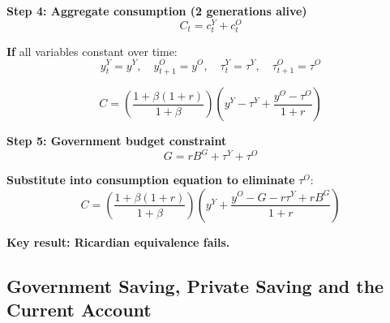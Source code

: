 \documentclass[12pt]{article}
\begin{document}
{\textbf{Step 4: Aggregate consumption (2 generations alive)}
\[
C_t = c_t^Y + c_t^O
\]

\textbf{If } all variables constant over time:
\[
y_t^Y = y^Y, \quad y_{t+1}^O = y^O, \quad \tau_t^Y = \tau^Y, \quad \tau_{t+1}^O = \tau^O
\]

\[
C = \left( \frac{1 + \beta (1 + r)}{1 + \beta} \right) \left( y^Y - \tau^Y + \frac{y^O - \tau^O}{1 + r} \right)
\]

\textbf{Step 5: Government budget constraint}
\[
G = r B^G + \tau^Y + \tau^O
\]

\textbf{Substitute into consumption equation to eliminate } \( \tau^O \):
\[
C = \left( \frac{1 + \beta (1 + r)}{1 + \beta} \right) \left( y^Y + \frac{y^O - G - r \tau^Y + r B^G}{1 + r} \right)
\]

\textbf{Key result: Ricardian equivalence fails.}
}

\subsection*{\noindent\textbf{Government Saving, Private Saving and the Current Account}}
\end{document}
